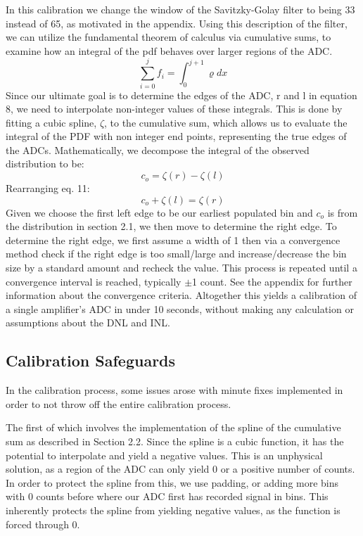 \documentclass[11pt, letterpaper]{article}
\begin{document}
In this calibration we change the window of the Savitzky-Golay filter to being 33 instead of 65, as motivated in the appendix. 
Using this description of the filter, we can utilize the fundamental theorem of calculus via cumulative sums, to examine how an integral of the pdf behaves over larger regions of the ADC. 
 \begin{equation}\label{}
\sum_{i=0}^{j} f_i= \int_{0}^{j+1} \varrho dx
\end{equation}
Since our ultimate goal is to determine the edges of the ADC, r and l in equation 8, we need to interpolate non-integer values of these integrals. 
This is done by fitting a cubic spline, $ \zeta$, to the cumulative sum, which allows us to evaluate the integral of the PDF with non integer end points, representing the true edges of the ADCs. 
Mathematically, we decompose the integral of the observed distribution to be:
 \begin{equation}\label{}
c_o = \zeta(r) - \zeta(l)
\end{equation}
Rearranging eq. 11: 
 \begin{equation}\label{}
c_o + \zeta(l) = \zeta(r)
\end{equation}
Given we choose the first left edge to be our earliest populated bin and $c_{o}$ is from the distribution in section 2.1, we then move to determine the right edge. 
To determine the right edge, we first assume a width of 1 then via a convergence method check if the right edge is too small/large and increase/decrease the bin size by a standard amount and recheck the value. 
This process is repeated until a convergence interval is reached, typically $\pm$1 count. 
See the appendix for further information about the convergence criteria. 
Altogether this yields a calibration of a single amplifier's ADC in under 10 seconds, without making any calculation or assumptions about the DNL and INL.


\subsection{Calibration Safeguards} 
\indent 


In the calibration process, some issues arose with minute fixes implemented in order to not throw off the entire calibration process. 
\indent 


The first of which involves the implementation of the spline of the cumulative sum as described in Section 2.2. 
Since the spline is a cubic function, it has the potential to interpolate and yield a negative values. 
This is an unphysical solution, as a region of the ADC can only yield 0 or a positive number of counts. 
In order to protect the spline from this, we use padding, or adding more bins with 0 counts before where our ADC first has recorded signal in bins. 
This inherently protects the spline from yielding negative values, as the function is forced through 0. 
\indent 
\end{document}
